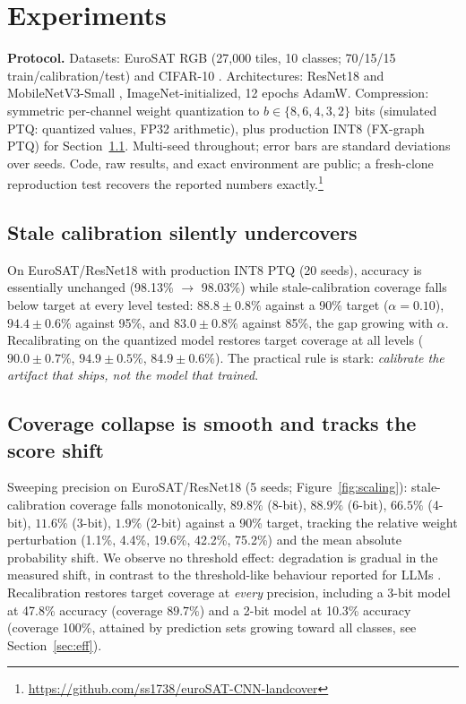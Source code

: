 \documentclass[11pt]{article}
\begin{document}
\section{Experiments}

\textbf{Protocol.} Datasets: EuroSAT RGB \citep{helber2019} (27{,}000 tiles,
10 classes; 70/15/15 train/calibration/test) and CIFAR-10 \citep{krizhevsky2009}.
Architectures: ResNet18 \citep{he2016} and MobileNetV3-Small
\citep{howard2019}, ImageNet-initialized, 12 epochs AdamW. Compression:
symmetric per-channel weight quantization to $b \in \{8,6,4,3,2\}$ bits
(simulated PTQ: quantized values, FP32 arithmetic), plus production INT8
(FX-graph PTQ) for Section~\ref{sec:break}. Multi-seed throughout; error bars
are standard deviations over seeds. Code, raw results, and exact environment
are public; a fresh-clone reproduction test recovers the reported numbers
exactly.\footnote{\url{https://github.com/ss1738/euroSAT-CNN-landcover}}

\subsection{Stale calibration silently undercovers}\label{sec:break}

On EuroSAT/ResNet18 with production INT8 PTQ (20 seeds), accuracy is
essentially unchanged (98.13\% $\to$ 98.03\%) while stale-calibration
coverage falls below target at every level tested: $88.8 \pm 0.8\%$ against a
90\% target ($\alpha{=}0.10$), $94.4 \pm 0.6\%$ against 95\%, and
$83.0 \pm 0.8\%$ against 85\%, the gap growing with $\alpha$. Recalibrating
on the quantized model restores target coverage at all levels
($90.0 \pm 0.7\%$, $94.9 \pm 0.5\%$, $84.9 \pm 0.6\%$). The practical rule is
stark: \emph{calibrate the artifact that ships, not the model that trained}.

\subsection{Coverage collapse is smooth and tracks the score shift}\label{sec:scaling}

Sweeping precision on EuroSAT/ResNet18 (5 seeds;
Figure~\ref{fig:scaling}): stale-calibration coverage falls monotonically,
$89.8\%$ (8-bit), $88.9\%$ (6-bit), $66.5\%$ (4-bit), $11.6\%$ (3-bit),
$1.9\%$ (2-bit) against a 90\% target, tracking the relative weight
perturbation (1.1\%, 4.4\%, 19.6\%, 42.2\%, 75.2\%) and the mean absolute
probability shift. We observe no threshold effect: degradation is gradual in
the measured shift, in contrast to the threshold-like behaviour reported for
LLMs \citep{compressionUQ2026}. Recalibration restores target coverage at
\emph{every} precision, including a 3-bit model at 47.8\% accuracy (coverage
$89.7\%$) and a 2-bit model at 10.3\% accuracy (coverage 100\%, attained by
prediction sets growing toward all classes, see Section~\ref{sec:eff}).
\end{document}

